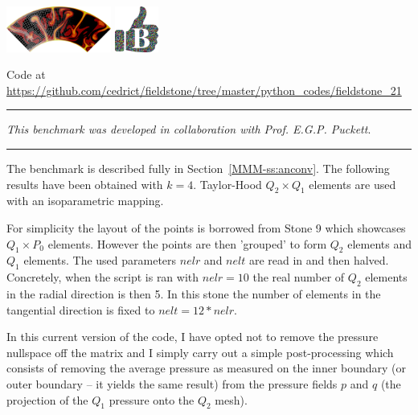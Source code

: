 
\includegraphics[height=1.5cm]{images/pictograms/aspect_logo}
\includegraphics[height=1.5cm]{images/pictograms/benchmark}



\begin{center}
Code at \url{https://github.com/cedrict/fieldstone/tree/master/python_codes/fieldstone_21}
\end{center}

\par\noindent\rule{\textwidth}{0.4pt}

{\sl This benchmark was developed in collaboration with Prof. E.G.P. Puckett}. 

\par\noindent\rule{\textwidth}{0.4pt}

The benchmark is described fully in Section~\ref{MMM-ss:anconv}. 
The following results have been obtained with $k=4$.
Taylor-Hood $Q_2\times Q_1$ elements are used with an isoparametric mapping. 

For simplicity the layout of the points is borrowed from Stone 9 which 
showcases $Q_1 \times P_0$ elements. However the points are then 'grouped' 
to form $Q_2$ elements and $Q_1$ elements. 
The used parameters $nelr$ and $nelt$ are read in and then halved. Concretely, 
when the script is ran with $nelr=10$ the real number of $Q_2$ elements 
in the radial direction is then 5. In this stone the number of elements
in the tangential direction is fixed to $nelt=12*nelr$.

In this current version of the code, I have opted not to remove the pressure nullspace
off the matrix and I simply carry out a simple post-processing which consists of 
removing the average pressure as measured on the inner boundary (or outer boundary -- it 
yields the same result) from the pressure fields $p$ and $q$ (the projection of the 
$Q_1$ pressure onto the $Q_2$ mesh). 

